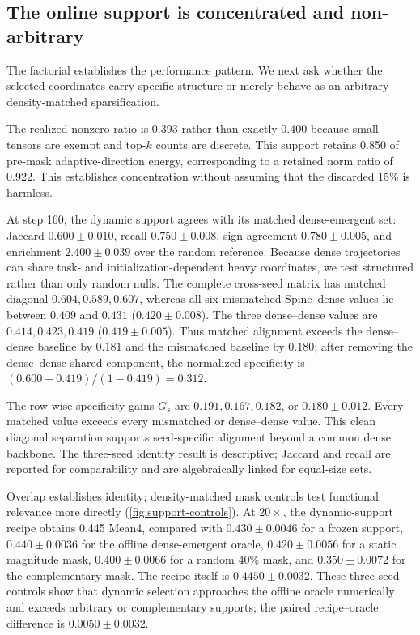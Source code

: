 \documentclass[5p,times]{elsarticle}
\begin{document}
\subsection{The online support is concentrated and non-arbitrary}
The factorial establishes the performance pattern. We next ask whether the
selected coordinates carry specific structure or merely behave as an arbitrary
density-matched sparsification.

The realized nonzero ratio is 0.393 rather than exactly 0.400 because small
tensors are exempt and top-$k$ counts are discrete. This support retains 0.850
of pre-mask adaptive-direction energy, corresponding to a retained norm ratio of 0.922.
This establishes concentration without assuming that the discarded 15\% is
harmless.

At step 160, the dynamic support agrees with its matched dense-emergent set:
Jaccard $0.600\pm0.010$, recall $0.750\pm0.008$, sign agreement
$0.780\pm0.005$, and enrichment $2.400\pm0.039$ over the random reference.
Because dense trajectories can share task- and initialization-dependent heavy
coordinates, we test structured rather than only random nulls. The complete
cross-seed matrix has matched diagonal
$0.604,0.589,0.607$, whereas all six mismatched Spine--dense values lie between
$0.409$ and $0.431$ ($0.420\pm0.008$). The three dense--dense values are
$0.414,0.423,0.419$ ($0.419\pm0.005$). Thus matched alignment exceeds the
dense--dense baseline by $0.181$ and the mismatched baseline by $0.180$; after
removing the dense--dense shared component, the normalized specificity is
$(0.600-0.419)/(1-0.419)=0.312$.

The row-wise specificity gains $G_s$ are $0.191,0.167,0.182$, or
$0.180\pm0.012$. Every matched value exceeds every mismatched or dense--dense
value. This clean diagonal separation supports seed-specific alignment beyond
a common dense backbone. The three-seed identity result is descriptive;
Jaccard and recall are reported for comparability and are algebraically linked
for equal-size sets.

Overlap establishes identity; density-matched mask controls test functional
relevance more directly (\cref{fig:support-controls}). At $20\times$, the
dynamic-support recipe obtains 0.445 Mean4, compared with
$0.430\pm0.0046$ for a frozen support,
$0.440\pm0.0036$ for the offline dense-emergent oracle,
$0.420\pm0.0056$ for a static magnitude mask, $0.400\pm0.0066$ for a random
40\% mask, and $0.350\pm0.0072$ for the complementary mask. The recipe itself
is $0.4450\pm0.0032$. These three-seed controls show that dynamic selection
approaches the offline oracle numerically and exceeds arbitrary or
complementary supports; the paired recipe--oracle difference is
$0.0050\pm0.0032$.
\end{document}
